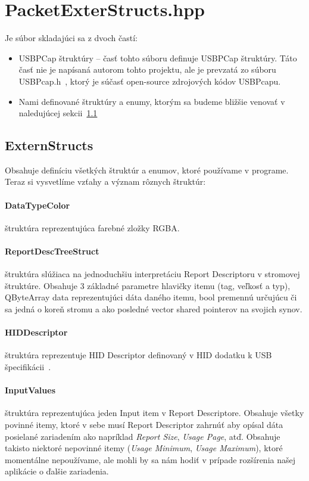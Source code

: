 \section{PacketExterStructs.hpp}
Je súbor skladajúci sa z dvoch častí:
\begin{itemize}
\item USBPCap štruktúry -- časť tohto súboru definuje USBPCap štruktúry. Táto časť nie je napísaná autorom tohto projektu, ale je prevzatá zo súboru USBPcap.h~\cite{usbpcap_usbpcaph_file}, ktorý je súčasť open-source zdrojových kódov USBPcapu.
\item Nami definované štruktúry a enumy, ktorým sa budeme bližšie venovať v naledujúcej sekcii~\ref{kap04:sec:extern_structs}
\end{itemize}

\subsection{ExternStructs}
\label{kap04:sec:extern_structs}

Obsahuje definíciu všetkých štruktúr a enumov, ktoré používame v programe. Teraz si vysvetlíme vzťahy a význam rôznych štruktúr:

\paragraph{DataTypeColor} štruktúra reprezentujúca farebné zložky RGBA.

\paragraph{ReportDescTreeStruct}\label{kap04:sec:report_tree_struct} štruktúra slúžiaca na jednoduchšiu interpretáciu Report Descriptoru v stromovej štruktúre. Obsahuje 3 základné parametre hlavičky itemu (tag, veľkosť a typ), QByteArray data reprezentujúci dáta daného itemu, bool premennú určujúcu či sa jedná o koreň stromu a ako posledné vector shared pointerov na svojich synov.

\paragraph{HIDDescriptor} štruktúra reprezentuje HID Descriptor definovaný v HID dodatku k USB špecifikácii~\cite{usbhid_hid_descriptor}.

\paragraph{InputValues} štruktúra reprezentujúca jeden Input item v Report Descriptore. Obsahuje všetky povinné itemy, ktoré v sebe musí Report Descriptor zahrnúť aby opísal dáta posielané zariadením ako napríklad \textit{Report Size}, \textit{Usage Page}, atď. Obsahuje takisto niektoré nepovinné itemy (\textit{Usage Minimum}, \textit{Usage Maximum}), ktoré momentálne nepoužívame, ale mohli by sa nám hodiť v prípade rozšírenia našej aplikácie o ďalšie zariadenia.

